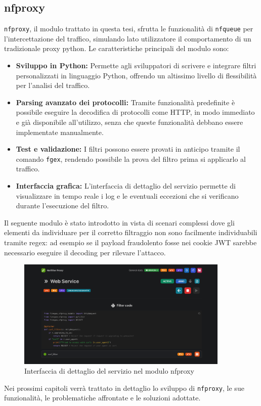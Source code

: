 \subsection{nfproxy}
\texttt{nfproxy}, il modulo trattato in questa tesi, sfrutta le funzionalità di \texttt{nfqueue} per l'intercettazione del traffico, simulando lato utilizzatore
il comportamento di un tradizionale proxy python. Le caratteristiche principali del modulo sono:
\begin{itemize}
    \setlength{\itemsep}{1pt}
    \setlength{\parskip}{1pt}
    \item \textbf{Sviluppo in Python:} Permette agli sviluppatori di scrivere e integrare filtri personalizzati in linguaggio Python, offrendo un altissimo livello di flessibilità per l'analisi del traffico.
    \item \textbf{Parsing avanzato dei protocolli:} Tramite funzionalità predefinite è possibile eseguire la decodifica di protocolli come HTTP, in modo immediato e già disponibile all'utilizzo,
    senza che queste funzionalità debbano essere implementate manualmente.
    \item \textbf{Test e validazione:} I filtri possono essere provati in anticipo tramite il comando \texttt{fgex}, rendendo possibile la prova del filtro prima si applicarlo al traffico.
    \item \textbf{Interfaccia grafica:} L'interfaccia di dettaglio del servizio permette di visualizzare in tempo reale i log e le eventuali eccezioni che si verificano durante l'esecuzione del filtro.
\end{itemize}

Il seguente modulo è stato introdotto in vista di scenari complessi dove gli elementi da individuare per il corretto filtraggio non sono facilmente
individuabili tramite regex: ad esempio se il payload fraudolento fosse nei cookie JWT sarebbe necessario eseguire il decoding per rilevare l'attacco.\\

\begin{figure}[H]
    \centering
    \includegraphics[width=0.9\textwidth]{images/chapter2/NFProxyInterface.png}
    \caption{Interfaccia di dettaglio del servizio nel modulo nfproxy}\label{fig:nfproxy_interface}
\end{figure}

Nei prossimi capitoli verrà trattato in dettaglio lo sviluppo di \texttt{nfproxy}, le sue funzionalità, le problematiche affrontate e le soluzioni adottate.
